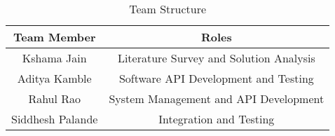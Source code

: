 \paragraph{}
\begin{table}[!htbp]
\begin{center}
\def\arraystretch{1.5}
  \begin{tabular}{| c | c |}
       \hline
       
Team Member & Roles \\ \hline
Kshama Jain & Literature Survey and Solution Analysis \\ \hline
Aditya Kamble & Software API Development and Testing \\ \hline
Rahul Rao & System Management and API Development \\ \hline
Siddhesh Palande & Integration and Testing \\ \hline
       
\end{tabular}
 \caption { Team Structure }
 \label{tab:hreq}
\end{center}

\end{table}
